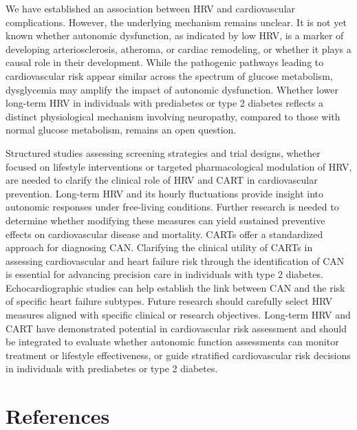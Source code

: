 \documentclass[
  a4paper,
  headsepline=true,
  open=any]{scrbook}
\begin{document}
We have established an association between HRV and cardiovascular
complications. However, the underlying mechanism remains unclear. It is
not yet known whether autonomic dysfunction, as indicated by low HRV, is
a marker of developing arteriosclerosis, atheroma, or cardiac
remodeling, or whether it plays a causal role in their development.
While the pathogenic pathways leading to cardiovascular risk appear
similar across the spectrum of glucose metabolism, dysglycemia may
amplify the impact of autonomic dysfunction. Whether lower long-term HRV
in individuals with prediabetes or type 2 diabetes reflects a distinct
physiological mechanism involving neuropathy, compared to those with
normal glucose metabolism, remains an open question.

Structured studies assessing screening strategies and trial designs,
whether focused on lifestyle interventions or targeted pharmacological
modulation of HRV, are needed to clarify the clinical role of HRV and
CART in cardiovascular prevention. Long-term HRV and its hourly
fluctuations provide insight into autonomic responses under free-living
conditions. Further research is needed to determine whether modifying
these measures can yield sustained preventive effects on cardiovascular
disease and mortality. CARTs offer a standardized approach for
diagnosing CAN. Clarifying the clinical utility of CARTs in assessing
cardiovascular and heart failure risk through the identification of CAN
is essential for advancing precision care in individuals with type 2
diabetes. Echocardiographic studies can help establish the link between
CAN and the risk of specific heart failure subtypes. Future research
should carefully select HRV measures aligned with specific clinical or
research objectives. Long-term HRV and CART have demonstrated potential
in cardiovascular risk assessment and should be integrated to evaluate
whether autonomic function assessments can monitor treatment or
lifestyle effectiveness, or guide stratified cardiovascular risk
decisions in individuals with prediabetes or type 2 diabetes.


\hypertarget{references}{%
\chapter*{References}\label{references}}

\end{document}
